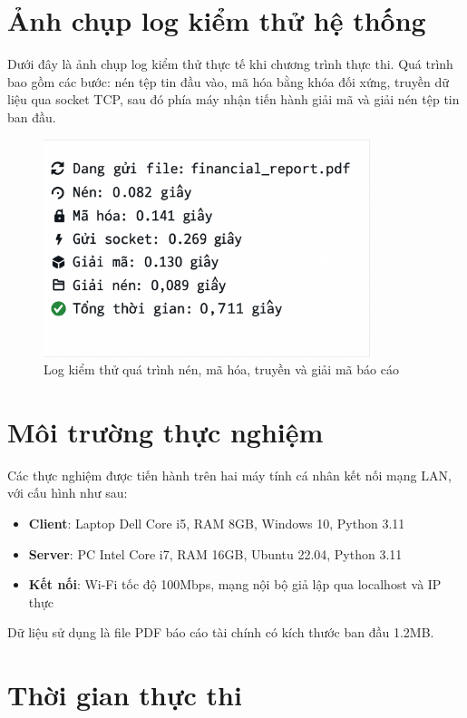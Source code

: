 \section{Ảnh chụp log kiểm thử hệ thống}

Dưới đây là ảnh chụp log kiểm thử thực tế khi chương trình thực thi. Quá trình bao gồm các bước: nén tệp tin đầu vào, mã hóa bằng khóa đối xứng, truyền dữ liệu qua socket TCP, sau đó phía máy nhận tiến hành giải mã và giải nén tệp tin ban đầu.

\begin{figure}[H]
    \centering
    \includegraphics[width=0.85\textwidth]{figs/test.png}
    \caption{Log kiểm thử quá trình nén, mã hóa, truyền và giải mã báo cáo}
\end{figure}


\section{Môi trường thực nghiệm}

Các thực nghiệm được tiến hành trên hai máy tính cá nhân kết nối mạng LAN, với cấu hình như sau:

\begin{itemize}
  \item \textbf{Client}: Laptop Dell Core i5, RAM 8GB, Windows 10, Python 3.11
  \item \textbf{Server}: PC Intel Core i7, RAM 16GB, Ubuntu 22.04, Python 3.11
  \item \textbf{Kết nối}: Wi-Fi tốc độ 100Mbps, mạng nội bộ giả lập qua localhost và IP thực
\end{itemize}

Dữ liệu sử dụng là file PDF báo cáo tài chính có kích thước ban đầu 1.2MB.

\section{Thời gian thực thi}

